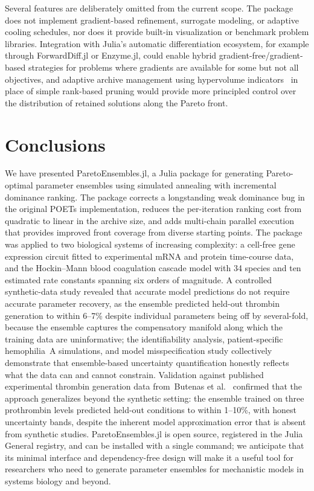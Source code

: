 \documentclass[preprint,review,12pt]{elsarticle}
\begin{document}
Several features are deliberately omitted from the current scope.
The package does not implement gradient-based refinement, surrogate modeling, or adaptive cooling schedules, nor does it provide built-in visualization or benchmark problem libraries.
Integration with Julia's automatic differentiation ecosystem, for example through ForwardDiff.jl or Enzyme.jl, could enable hybrid gradient-free/gradient-based strategies for problems where gradients are available for some but not all objectives, and adaptive archive management using hypervolume indicators~\cite{Zitzler2003} in place of simple rank-based pruning would provide more principled control over the distribution of retained solutions along the Pareto front.

\section{Conclusions}\label{sec:conclusions}
We have presented ParetoEnsembles.jl, a Julia package for generating Pareto-optimal parameter ensembles using simulated annealing with incremental dominance ranking.
The package corrects a longstanding weak dominance bug in the original POETs implementation, reduces the per-iteration ranking cost from quadratic to linear in the archive size, and adds multi-chain parallel execution that provides improved front coverage from diverse starting points.
The package was applied to two biological systems of increasing complexity: a cell-free gene expression circuit fitted to experimental mRNA and protein time-course data, and the Hockin--Mann blood coagulation cascade model with 34 species and ten estimated rate constants spanning six orders of magnitude.
A controlled synthetic-data study revealed that accurate model predictions do not require accurate parameter recovery, as the ensemble predicted held-out thrombin generation to within 6--7\% despite individual parameters being off by several-fold, because the ensemble captures the compensatory manifold along which the training data are uninformative; the identifiability analysis, patient-specific hemophilia~A simulations, and model misspecification study collectively demonstrate that ensemble-based uncertainty quantification honestly reflects what the data can and cannot constrain.
Validation against published experimental thrombin generation data from~Butenas et al.~\cite{Butenas1999} confirmed that the approach generalizes beyond the synthetic setting: the ensemble trained on three prothrombin levels predicted held-out conditions to within 1--10\%, with honest uncertainty bands, despite the inherent model approximation error that is absent from synthetic studies.
ParetoEnsembles.jl is open source, registered in the Julia General registry, and can be installed with a single command; we anticipate that its minimal interface and dependency-free design will make it a useful tool for researchers who need to generate parameter ensembles for mechanistic models in systems biology and beyond.
\end{document}
